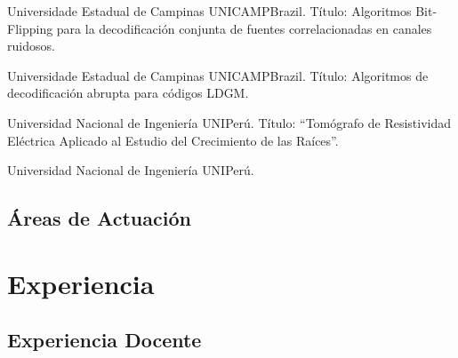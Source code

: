 \documentclass[11pt,a4paper,sans]{moderncv} %
\begin{document}
	      {Universidade Estadual de Campinas}
	      {UNICAMP}{Brazil.}
	      {Título: Algoritmos Bit-Flipping para la decodificación conjunta de fuentes correlacionadas en canales ruidosos.}
	      
	      {Universidade Estadual de Campinas}
	      {UNICAMP}{Brazil.}
	      {Título: Algoritmos de decodificación abrupta para códigos LDGM.}  %
	      
	      {Universidad Nacional de Ingeniería}
	      {UNI}{Perú.}
	      {Título: ``Tomógrafo de Resistividad Eléctrica Aplicado al Estudio del Crecimiento de las Raíces''.}
	      
	      {Universidad Nacional de Ingeniería}
	      {UNI}{Perú.}{}

\subsection{Áreas de Actuación}


%


\section{Experiencia}

\subsection{Experiencia Docente}
\end{document}
